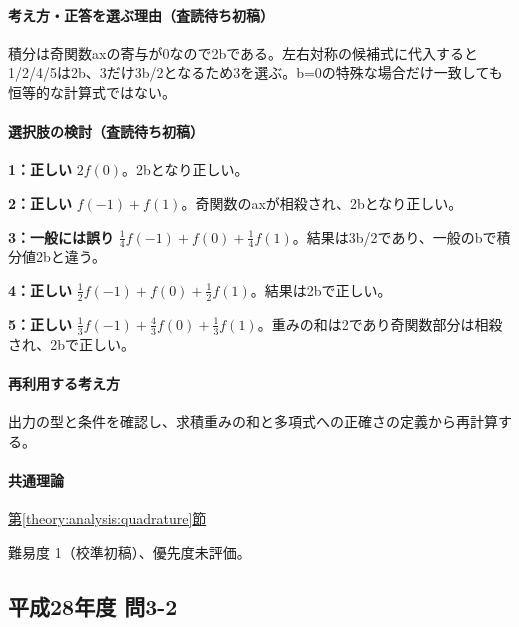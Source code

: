 \paragraph{考え方・正答を選ぶ理由（査読待ち初稿）} 積分は奇関数axの寄与が0なので2bである。左右対称の候補式に代入すると1/2/4/5は2b、3だけ3b/2となるため3を選ぶ。b=\allowbreak{}0の特殊な場合だけ一致しても恒等的な計算式ではない。

\paragraph{選択肢の検討（査読待ち初稿）}\mbox{}\par

\noindent\textbf{1：正しい} \(2f(0)\)。2bとなり正しい。\par

\noindent\textbf{2：正しい} \(f(-1)+f(1)\)。奇関数のaxが相殺され、2bとなり正しい。\par

\noindent\textbf{3：一般には誤り} \(\frac14f(-1)+f(0)+\frac14f(1)\)。結果は3b/2であり、一般のbで積分値2bと違う。\par

\noindent\textbf{4：正しい} \(\frac12f(-1)+f(0)+\frac12f(1)\)。結果は2bで正しい。\par

\noindent\textbf{5：正しい} \(\frac13f(-1)+\frac43f(0)+\frac13f(1)\)。重みの和は2であり奇関数部分は相殺され、2bで正しい。\par

\paragraph{再利用する考え方} 出力の型と条件を確認し、求積重みの和と多項式への正確さの定義から再計算する。

\paragraph{共通理論} \hyperref[theory:analysis:quadrature]{第\ref*{theory:analysis:quadrature}節}

\par 難易度 1（校準初稿）、優先度未評価。

\subsection{平成28年度 問3-2}
\label{q:h28-reg-basic-3-2}

